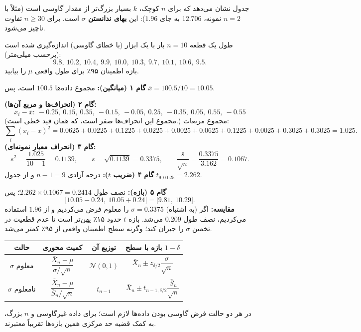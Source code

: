 جدول نشان می‌دهد که برای $n$ کوچک، $k$ بسیار بزرگ‌تر از مقدار گاوسی است (مثلاً با $n=2$ نمونه، $12.706$ به جای $1.96$): این \textbf{بهای ندانستن $\sigma$} است. برای $n\ge30$ تفاوت ناچیز می‌شود.

\begin{example}
طول یک قطعه $n=10$ بار با یک ابزار (با خطای گاوسی) اندازه‌گیری شده است (برحسب میلی‌متر):
\[
9.8,\ 10.2,\ 10.4,\ 9.9,\ 10.0,\ 10.3,\ 9.7,\ 10.1,\ 10.6,\ 9.5 .
\]
بازه اطمینان ۹۵٪ برای طول واقعی $\mu$ را بیابید.
\begin{solution}
\textbf{گام ۱ (میانگین):} مجموع داده‌ها $100.5$ است، پس $\bar x=100.5/10=10.05$.

\textbf{گام ۲ (انحراف‌ها و مربع آن‌ها):}
\[
x_i-\bar x:\ -0.25,\ 0.15,\ 0.35,\ -0.15,\ -0.05,\ 0.25,\ -0.35,\ 0.05,\ 0.55,\ -0.55
\]
(مجموع این انحراف‌ها صفر است، که همان قید خطی است.) مجموع مربعات:
\[
\sum_i(x_i-\bar x)^2=0.0625+0.0225+0.1225+0.0225+0.0025+0.0625+0.1225+0.0025+0.3025+0.3025=1.025 .
\]
\textbf{گام ۳ (انحراف معیار نمونه‌ای):}
\[
\bar s^2=\frac{1.025}{10-1}=0.1139,\qquad \bar s=\sqrt{0.1139}=0.3375,\qquad \frac{\bar s}{\sqrt n}=\frac{0.3375}{3.162}=0.1067 .
\]
\textbf{گام ۴ (ضریب $t$):} درجه آزادی $n-1=9$ و از جدول $t_{9,0.025}=2.262$.

\textbf{گام ۵ (بازه):} نصف طول $2.262\times0.1067=0.2414$؛ پس
\[
\big[10.05-0.24,\ 10.05+0.24\big]=\big[9.81,\ 10.29\big].
\]
\textbf{مقایسه:} اگر (به اشتباه) $\sigma=0.3375$ را معلوم فرض می‌کردیم و از $1.96$ استفاده می‌کردیم، نصف طول $0.209$ می‌شد. بازه $t$ حدود ۱۵٪ پهن‌تر است تا عدم قطعیت در تخمین $\sigma$ را جبران کند؛ وگرنه سطح اطمینان واقعی از ۹۵٪ کمتر می‌شد.
\end{solution}
\end{example}

\begin{summarybox}
\begin{center}
\renewcommand{\arraystretch}{1.5}
\begin{tabular}{c|c|c|c}
حالت & کمیت محوری & توزیع آن & بازه با سطح $1-\delta$\\\hline
$\sigma$ معلوم & $\dfrac{\bar X_n-\mu}{\sigma/\sqrt n}$ & $\mathcal N(0,1)$ & $\bar X_n\pm z_{\delta/2}\dfrac{\sigma}{\sqrt n}$\\[2mm]
$\sigma$ نامعلوم & $\dfrac{\bar X_n-\mu}{\bar S_n/\sqrt n}$ & $t_{n-1}$ & $\bar X_n\pm t_{n-1,\delta/2}\dfrac{\bar S_n}{\sqrt n}$
\end{tabular}
\end{center}
در هر دو حالت فرض گاوسی بودن داده‌ها لازم است؛ برای داده غیرگاوسی و $n$ بزرگ، به کمک قضیه حد مرکزی همین بازه‌ها تقریباً معتبرند.
\end{summarybox}

